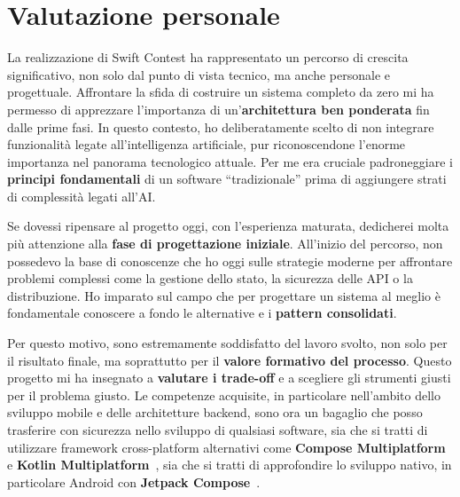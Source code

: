 \section{Valutazione personale}\label{sec:valutazione-personale}
La realizzazione di Swift Contest ha rappresentato un percorso di crescita significativo, non solo dal punto di vista tecnico, ma anche personale e progettuale.
Affrontare la sfida di costruire un sistema completo da zero mi ha permesso di apprezzare l'importanza di un'\textbf{architettura ben ponderata} fin dalle prime fasi.
In questo contesto, ho deliberatamente scelto di non integrare funzionalità legate all'intelligenza artificiale, pur riconoscendone l'enorme importanza nel panorama tecnologico attuale.
Per me era cruciale padroneggiare i \textbf{principi fondamentali} di un software ``tradizionale'' prima di aggiungere strati di complessità legati all'AI\@.

Se dovessi ripensare al progetto oggi, con l'esperienza maturata, dedicherei molta più attenzione alla \textbf{fase di progettazione iniziale}.
All'inizio del percorso, non possedevo la base di conoscenze che ho oggi sulle strategie moderne per affrontare problemi complessi come la gestione dello stato, la sicurezza delle API o la distribuzione.
Ho imparato sul campo che per progettare un sistema al meglio è fondamentale conoscere a fondo le alternative e i \textbf{pattern consolidati}.

Per questo motivo, sono estremamente soddisfatto del lavoro svolto, non solo per il risultato finale, ma soprattutto per il \textbf{valore formativo del processo}.
Questo progetto mi ha insegnato a \textbf{valutare i trade-off} e a scegliere gli strumenti giusti per il problema giusto.
Le competenze acquisite, in particolare nell'ambito dello sviluppo mobile e delle architetture backend, sono ora un bagaglio che posso trasferire con sicurezza nello sviluppo di qualsiasi software, sia che si tratti di utilizzare framework cross-platform alternativi come \textbf{Compose Multiplatform}~\cite{compose_multiplatform_docs} e \textbf{Kotlin Multiplatform}~\cite{kotlin_multiplatform_docs}, sia che si tratti di approfondire lo sviluppo nativo, in particolare Android con \textbf{Jetpack Compose}~\cite{jetpack_compose_docs}.